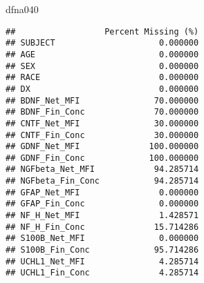 \documentclass[]{article}
\newenvironment{Shaded}{\begin{snugshade}}{\end{snugshade}}
\newcommand{\CommentTok}[1]{\textcolor[rgb]{0.56,0.35,0.01}{\textit{#1}}}
\newcommand{\ControlFlowTok}[1]{\textcolor[rgb]{0.13,0.29,0.53}{\textbf{#1}}}
\newcommand{\DataTypeTok}[1]{\textcolor[rgb]{0.13,0.29,0.53}{#1}}
\newcommand{\DecValTok}[1]{\textcolor[rgb]{0.00,0.00,0.81}{#1}}
\newcommand{\KeywordTok}[1]{\textcolor[rgb]{0.13,0.29,0.53}{\textbf{#1}}}
\newcommand{\NormalTok}[1]{#1}
\newcommand{\OperatorTok}[1]{\textcolor[rgb]{0.81,0.36,0.00}{\textbf{#1}}}
\newcommand{\StringTok}[1]{\textcolor[rgb]{0.31,0.60,0.02}{#1}}
\begin{document}
\begin{Shaded}
\begin{Highlighting}[]
\NormalTok{dfna040}
\end{Highlighting}
\end{Shaded}

\begin{verbatim}
##                  Percent Missing (%)
## SUBJECT                     0.000000
## AGE                         0.000000
## SEX                         0.000000
## RACE                        0.000000
## DX                          0.000000
## BDNF_Net_MFI               70.000000
## BDNF_Fin_Conc              70.000000
## CNTF_Net_MFI               30.000000
## CNTF_Fin_Conc              30.000000
## GDNF_Net_MFI              100.000000
## GDNF_Fin_Conc             100.000000
## NGFbeta_Net_MFI            94.285714
## NGFbeta_Fin_Conc           94.285714
## GFAP_Net_MFI                0.000000
## GFAP_Fin_Conc               0.000000
## NF_H_Net_MFI                1.428571
## NF_H_Fin_Conc              15.714286
## S100B_Net_MFI               0.000000
## S100B_Fin_Conc             95.714286
## UCHL1_Net_MFI               4.285714
## UCHL1_Fin_Conc              4.285714
\end{verbatim}

\begin{Shaded}
\end{Shaded}
\end{document}
